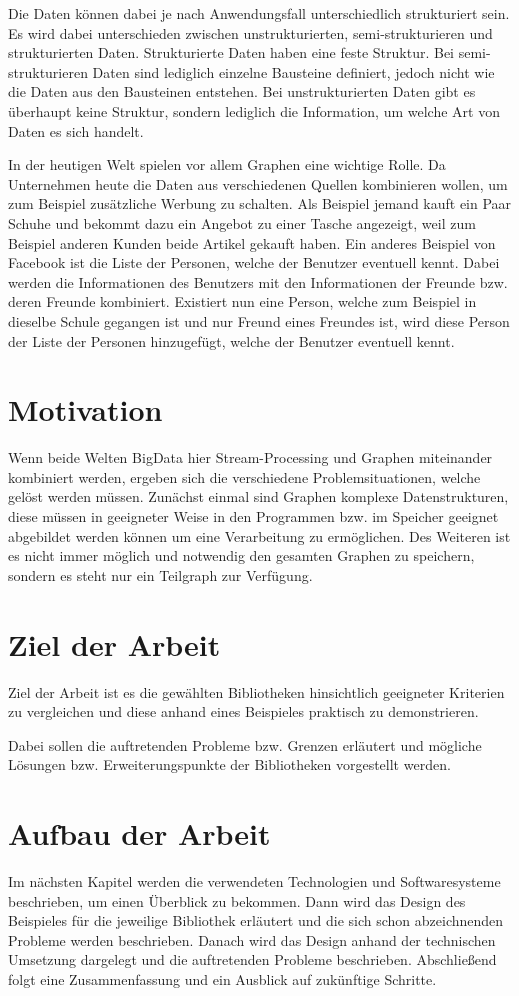 Die Daten können dabei je nach Anwendungsfall unterschiedlich strukturiert sein.
Es wird dabei unterschieden zwischen unstrukturierten, semi-strukturieren
und strukturierten Daten. Strukturierte Daten haben eine feste Struktur. Bei
semi-strukturieren Daten sind lediglich einzelne Bausteine definiert,
jedoch nicht wie die Daten aus den Bausteinen entstehen. Bei unstrukturierten
Daten gibt es überhaupt keine Struktur, sondern lediglich die Information, um
welche Art von Daten es sich handelt.

In der heutigen Welt spielen vor allem Graphen eine wichtige Rolle. Da 
Unternehmen heute die Daten aus verschiedenen Quellen kombinieren wollen, um zum
Beispiel zusätzliche Werbung zu schalten. Als Beispiel jemand kauft ein Paar
Schuhe und bekommt dazu ein Angebot zu einer Tasche angezeigt, weil zum
Beispiel anderen Kunden beide Artikel gekauft haben. Ein anderes Beispiel von
Facebook ist die Liste der Personen, welche der Benutzer eventuell kennt.
Dabei werden die Informationen des Benutzers mit den Informationen der Freunde
bzw. deren Freunde kombiniert. Existiert nun eine Person, welche zum Beispiel
in dieselbe Schule gegangen ist und nur Freund eines Freundes ist, wird diese
Person der Liste der Personen hinzugefügt, welche der Benutzer eventuell kennt.

\section{Motivation}
Wenn beide Welten \gls{BigData} hier Stream-Processing und Graphen miteinander
kombiniert werden, ergeben sich die verschiedene Problemsituationen, welche
gelöst werden müssen. Zunächst einmal sind Graphen komplexe Datenstrukturen,
diese müssen in geeigneter Weise in den Programmen bzw. im Speicher geeignet
abgebildet werden können um eine Verarbeitung zu ermöglichen. Des Weiteren ist
es nicht immer möglich und notwendig den gesamten Graphen zu speichern, sondern
es steht nur ein Teilgraph zur Verfügung.

\section{Ziel der Arbeit}
Ziel der Arbeit ist es die gewählten Bibliotheken hinsichtlich geeigneter
Kriterien zu vergleichen und diese anhand eines Beispieles praktisch zu
demonstrieren.

Dabei sollen die auftretenden Probleme bzw. Grenzen erläutert und mögliche
Lösungen bzw. Erweiterungspunkte der Bibliotheken vorgestellt werden.

\section{Aufbau der Arbeit}
Im nächsten Kapitel werden die verwendeten Technologien und Softwaresysteme
beschrieben, um einen Überblick zu bekommen. Dann wird das Design des Beispieles
für die jeweilige Bibliothek erläutert und die sich schon abzeichnenden Probleme
werden beschrieben. Danach wird das Design anhand der technischen Umsetzung
dargelegt und die auftretenden Probleme beschrieben. Abschließend folgt eine
Zusammenfassung und ein Ausblick auf zukünftige Schritte.
